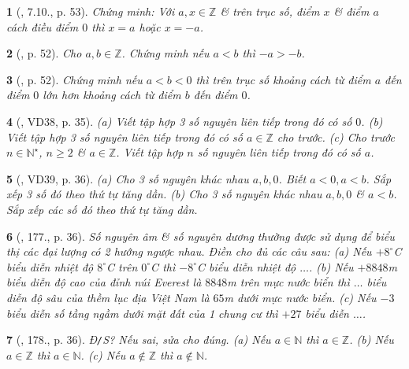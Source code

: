 \documentclass{article}
\newtheorem{baitoan}{}
\begin{document}
\begin{baitoan}[\cite{Binh_boi_duong_Toan_6_tap_1}, 7.10., p. 53]
	Chứng minh: Với $a,x\in\mathbb{Z}$ \& trên trục số, điểm $x$ \& điểm $a$ cách điều điểm $0$ thì $x = a$ hoặc $x = -a$.
\end{baitoan}

\begin{baitoan}[\cite{Binh_boi_duong_Toan_6_tap_1}, p. 52]
	Cho $a,b\in\mathbb{Z}$. Chứng minh nếu $a < b$ thì $-a > -b$.	
\end{baitoan}

\begin{baitoan}[\cite{Binh_boi_duong_Toan_6_tap_1}, p. 52]
	Chứng minh nếu $a < b < 0$ thì trên trục số khoảng cách từ điểm $a$ đến điểm $0$ lớn hơn khoảng cách từ điểm $b$ đến điểm $0$.	
\end{baitoan}

\begin{baitoan}[\cite{Tuyen_Toan_6}, VD38, p. 35]
	(a) Viết tập hợp 3 số nguyên liên tiếp trong đó có số $0$. (b) Viết tập hợp 3 số nguyên liên tiếp trong đó có số $a\in\mathbb{Z}$ cho trước. (c) Cho trước $n\in\mathbb{N}^\star$, $n\ge2$ \& $a\in\mathbb{Z}$. Viết tập hợp $n$ số nguyên liên tiếp trong đó có số $a$.
\end{baitoan}

\begin{baitoan}[\cite{Tuyen_Toan_6}, VD39, p. 36]
	(a) Cho 3 số nguyên khác nhau $a,b,0$. Biết $a < 0,a < b$. Sắp xếp 3 số đó theo thứ tự tăng dần. (b) Cho 3 số nguyên khác nhau $a,b,0$ \& $a < b$. Sắp xếp các số đó theo thứ tự tăng dần.
\end{baitoan}

\begin{baitoan}[\cite{Tuyen_Toan_6}, 177., p. 36]
	Số nguyên âm \& số nguyên dương thường được sử dụng để biểu thị các đại lượng có 2 hướng ngược nhau. Điền cho đủ các câu sau: (a) Nếu $+8^\circ$C biểu diễn nhiệt độ $8^\circ$C trên $0^\circ$C thì $-8^\circ$C biểu diễn nhiệt độ $\ldots$. (b) Nếu $+8848$\emph{m} biểu diễn độ cao của đỉnh núi Everest là $8848$\emph{m} trên mực nước biển thì $\ldots$ biểu diễn độ sâu của thềm lục địa Việt Nam là $65$\emph{m} dưới mực nước biển. (c) Nếu $-3$ biểu diễn số tầng ngầm dưới mặt đất của 1 chung cư thì $+27$ biểu diễn $\ldots$.
\end{baitoan}

\begin{baitoan}[\cite{Tuyen_Toan_6}, 178., p. 36]
	{\rm Đ{\tt/}S?} Nếu sai, sửa cho đúng. (a) Nếu $a\in\mathbb{N}$ thì $a\in\mathbb{Z}$. (b) Nếu $a\in\mathbb{Z}$ thì $a\in\mathbb{N}$. (c) Nếu $a\notin\mathbb{Z}$ thì $a\notin\mathbb{N}$.
\end{baitoan}
\end{document}
